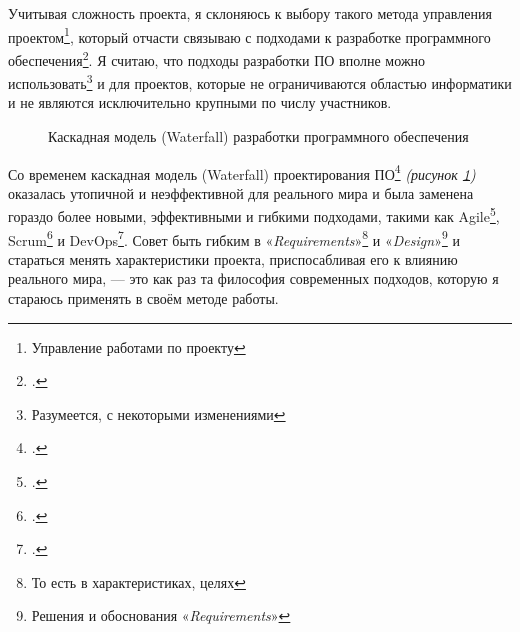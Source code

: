 \documentclass[a4paper, 10pt, final]{article} %
\newcommand{\InvisibleBorder}{
    (current bounding box.south west) ++($(-\fboxsep, -\fboxsep)-(0.5,0.5)$) coordinate (ll)
    (current bounding box.north east) ++($(\fboxsep, \fboxsep)+(0.5,0.5)$) coordinate (ur)
}
\begin{document}
    Учитывая сложность проекта, я склоняюсь к выбору такого метода управления проектом\footnote{Управление работами по проекту}, который отчасти связываю с подходами к разработке программного обеспечения\footcite[]{SoftwareDevelopmentProcess:Wiki}.
    Я считаю, что подходы разработки ПО вполне можно использовать\footnote{Разумеется, с некоторыми изменениями} и для проектов, которые не ограничиваются областью информатики и не являются исключительно крупными по числу участников.
    \begin{figure}[H]
        \centering
        \caption{Каскадная модель (Waterfall) разработки программного обеспечения}
        \label{fig:Waterfall}
    \end{figure}
    Со временем каскадная модель (Waterfall) проектирования ПО\footcite[]{WaterfallModel:Wiki} \emph{(рисунок \ref{fig:Waterfall})} оказалась утопичной и неэффективной для реального мира и была заменена гораздо более новыми, эффективными и гибкими подходами, такими как Agile\footcite[]{AgileModel:Wiki}, Scrum\footcite[]{ScrumModel:Wiki} и DevOps\footcite[]{DevOpsModel:Wiki}.
    Совет быть гибким в «\emph{Requirements}»\footnote{То есть в характеристиках, целях} и «\emph{Design}»\footnote{Решения и обоснования «\emph{Requirements}»} и стараться менять характеристики проекта, приспосабливая его к влиянию реального мира, --- это как раз та философия современных подходов, которую я стараюсь применять в своём методе работы.
\end{document}
